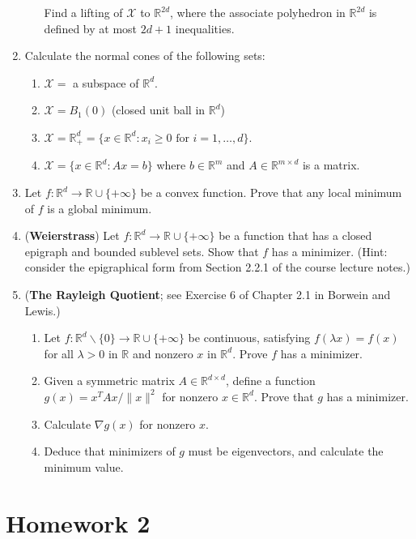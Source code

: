 \documentclass[12pt]{article}
\numberwithin{equation}{section}
\newcommand{\RR}{\mathbb{R}}
\newcommand{\cX}{\mathcal{X}}
\theoremstyle{remark}
\begin{document}
\begin{enumerate}
\begin{enumerate}
Find a lifting of $\cX$ to $\RR^{2d}$, where the associate polyhedron in $\RR^{2d}$ is defined by at most $2d+1$ inequalities. 


\end{enumerate}
\item Calculate the normal cones of the following sets:
\begin{enumerate}[noitemsep]
\item $\cX = $ a subspace of $\RR^d$. 
\item $\cX = B_1(0)$ (closed unit ball in $\RR^d$)
\item $\cX = \RR_+^d = \{x \in \RR^d \colon x_i \geq 0 \text{ for } i = 1, \ldots, d\}$.
\item $\cX = \{x \in \RR^d \colon Ax = b\}$ where $ b\in \RR^m$ and $A \in \RR^{m \times d}$ is a matrix. 
\end{enumerate}
\item Let $f \colon \RR^d \rightarrow \RR \cup\{+ \infty\}$ be a convex function. Prove that any local minimum of $f$ is a global minimum.
\item ({\bf Weierstrass}) Let $f \colon \RR^d \rightarrow \RR \cup \{+\infty\}$ be a function that has a closed epigraph and bounded sublevel sets. Show that $f$ has a minimizer. (Hint: consider the epigraphical form from Section 2.2.1 of the course lecture notes.)
\item ({\bf The Rayleigh Quotient}; see Exercise 6 of Chapter 2.1 in Borwein and Lewis.)  
\begin{enumerate}
\item Let $f \colon \RR^d \backslash \{0\} \rightarrow \RR \cup \{+\infty\}$ be continuous, satisfying $f(\lambda x) = f(x)$ for all $\lambda >0$ in $\RR$ and nonzero $x$ in $\RR^d$. Prove $f$ has a minimizer. 
\item Given a symmetric matrix $A \in \RR^{d\times d}$, define a function $g(x) = x^T A x/\|x\|^2$ for nonzero $x \in \RR^d$. Prove that $g$ has a minimizer.
\item Calculate $\nabla g(x)$ for nonzero $x$.
\item Deduce that minimizers of $g$ must be eigenvectors, and calculate the minimum value.
\end{enumerate}
\end{enumerate}

\newpage

\section{Homework 2} 
\end{document}
